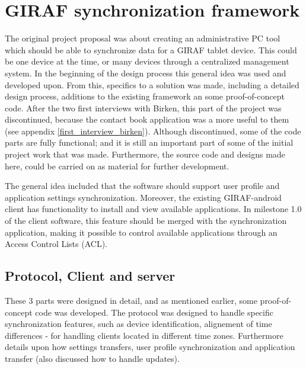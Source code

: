 \section{GIRAF synchronization framework}
The original project proposal was about creating an administrative PC tool which should be able to synchronize data for a GIRAF tablet device. This could be one device at the time, or many devices through a centralized management system. In the beginning of the design process this general idea was used and developed upon. From this, specifics to a solution was made, including a detailed design process, additions to the existing framework an some proof-of-concept code. After the two first interviews with Birken, this part of the project was discontinued, because the contact book application was a more useful to them (see appendix \vref{first_interview_birken}). Although discontinued, some of the code parts are fully functional; and it is still an important part of some of the initial project work that was made. Furthermore, the source code and designs made here, could be carried on as material for further development. 

The general idea included that the software should support user profile and application settings synchronization. Moreover, the existing GIRAF-android client has functionality to install and view available applications. In milestone 1.0 of the client software, this feature should be merged with the synchronization application, making it possible to control available applications through an Access Control Lists (ACL).

\subsection{Protocol, Client and server}
These 3 parts were designed in detail, and as mentioned earlier, some proof-of-concept code was developed. The protocol was designed to handle specific synchronization features, such as device identification, alignement of time differences - for handling clients located in different time zones. Furthermore details upon how settings transfers, user profile synchronization and application transfer (also discussed how to handle updates).  

